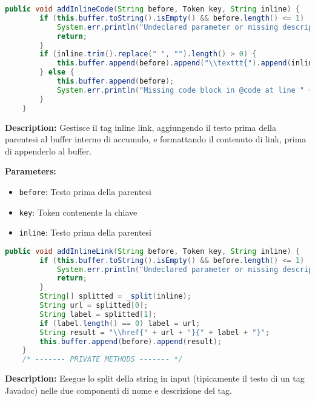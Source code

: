 \begin{lstlisting}[language=Java]
    public void addInlineCode(String before, Token key, String inline) {
        if (this.buffer.toString().isEmpty() && before.length() <= 1)  {
            System.err.println("Undeclared parameter or missing description at line " + key.getLine() + " before the inline code.");
            return;
        }
        if (inline.trim().replace(" ", "").length() > 0) {
            this.buffer.append(before).append("\\texttt{").append(inline).append("}");
        } else {
            this.buffer.append(before);
            System.err.println("Missing code block in @code at line " + key.getLine());
        }
    }
\end{lstlisting}
\vspace{0.5cm}
\textbf{Description:}  Gestisce il tag inline link, aggiungendo il testo prima della parentesi al buffer interno di accumulo, e formattando il contenuto di \atsign link, prima di appenderlo al buffer.  

\textbf{Parameters:}
\begin{itemize}
  \item\texttt{before}: Testo prima della parentesi 
  \item\texttt{key}: Token contenente la chiave 
  \item\texttt{inline}: Testo prima della parentesi  
\end{itemize}

\begin{lstlisting}[language=Java]
    public void addInlineLink(String before, Token key, String inline) {
        if (this.buffer.toString().isEmpty() && before.length() <= 1)  {
            System.err.println("Undeclared parameter or missing description at line " + key.getLine() + " before the inline link.");
            return;
        }
        String[] splitted = _split(inline);
        String url = splitted[0];
        String label = splitted[1];
        if (label.length() == 0) label = url;
        String result = "\\href{" + url + "}{" + label + "}";
        this.buffer.append(before).append(result);
    }
    /* ------- PRIVATE METHODS ------- */
\end{lstlisting}
\vspace{0.5cm}
\textbf{Description:}  Esegue lo split della string in input (tipicamente il testo di un tag Javadoc) nelle due componenti di nome e descrizione del tag.  

